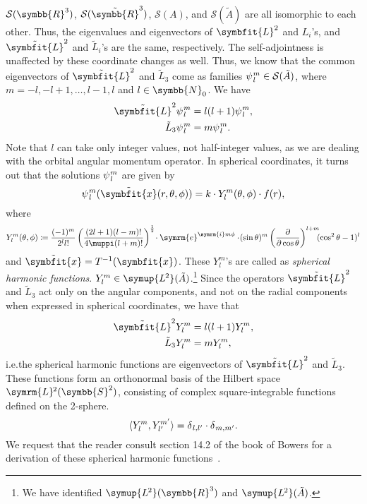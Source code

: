 \documentclass[12pt, a4 paper]{article}
\let\symcal\mathcal
\theoremstyle{definition}
\newcommand{\ltwo}{\symup{L\kern-0.5pt^2}}
\newcommand{\ltworthree}{\ltwo(\rr^3)}
\newcommand{\rr}{\symbb{R}}
\newcommand{\nn}{\symbb{N}_0}
\newcommand{\schwartz}{\symcal{S}}
\newcommand{\schwartzrthree}{\schwartz(\rr^3)}
\renewcommand{\i}{\symrm{i}}
\newcommand{\e}{\symrm{e}}
\renewcommand{\pi}{\muppi}
\newcommand{\lvecsquare}{\tilde{\symbfit{L}}^2}
\newcommand{\ltwoa}{\ltwo(\tilde{A})}
\newcommand{\sphe}{Y_l^m}
\begin{document}
    \(\schwartzrthree\), \(\schwartz(\tilde{\rr}^3)\), \(\schwartz(A)\), and \(\schwartz(\tilde{A})\) are all isomorphic to each other. Thus, the eigenvalues and eigenvectors of \(\symbfit{L}^2\) and \(L_i\)'s, and \(\lvecsquare\) and \(\tilde{L}_i\)'s are the same, respectively. The self-adjointness is unaffected by these coordinate changes as well. Thus, we know that the common eigenvectors of $\lvecsquare$ and $\tilde{L}_3$ come as families $\psi\kern0.5pt_l^m \in \schwartz(\tilde{A})$, where $m = -l, -l+1, \ldots, l-1, l$ and $l \in \nn$. We have
    \begin{align*}
        \lvecsquare \psi\kern0.5pt_l^m &= l(l+1)\psi\kern0.5pt_l^m,\\
        \tilde{L}_3 \psi\kern0.5pt_l^m &= m \psi\kern0.5pt_l^m.
    \end{align*}
    Note that $l$ can take only integer values, not half-integer values, as we are dealing with the orbital angular momentum operator. In spherical coordinates, it turns out that the solutions $\psi\kern0.5pt_l^m$ are given by
    \[
        \psi\kern0.5pt_l^m (\tilde{\symbfit{x}} (r, \theta, \phi)) = k \cdot Y^m_l (\theta, \phi) \cdot f(r),
    \]
    where
    \[
        Y^m_l (\theta, \phi) \coloneq \frac{(-1)^m}{2^l l!}\left(\frac{(2l+1) (l-m)!}{4\pi (l+m)!}\right)^{\frac{1}{2}}\!\cdot\e^{\i m\phi}\cdot\!(\sin{\theta})^m \left(\frac{\partial}{\partial \cos{\theta}}\right)^{l+m}\!\!\!(\cos^2{\theta} -1)^l
    \]
    and $\tilde{\symbfit{x}} = T^{-1}(\symbfit{x})$. These $\sphe$'s are called as \textit{spherical harmonic functions}. \(\sphe \in \ltwoa\).\footnote{We have identified \(\ltworthree\) and \(\ltwoa\).} Since the operators $\lvecsquare$ and $\tilde{L}_3$ act only on the angular components, and not on the radial components when expressed in spherical coordinates, we have that
    \begin{align*}
        \lvecsquare \sphe &= l(l+1) \sphe,\\
        \tilde{L}_3 \sphe &= m \sphe,
    \end{align*}
    i.e.\@ the spherical harmonic functions are eigenvectors of $\lvecsquare$ and $\tilde{L}_3$. These functions form an orthonormal basis of the Hilbert space $\symrm{L}\kern-0.7pt^2(\symbb{S}^2)$, consisting of complex square-integrable functions defined on the 2-sphere.
    \[
        \langle \sphe , Y_{l'}^{m'} \rangle = \delta\kern0.5pt_{l, l'}\cdot\delta\kern0.4pt_{m, m'}.
    \]
    We request that the reader consult section 14.2 of the book of Bowers for a derivation of these spherical harmonic functions~\cite[p.~200]{Bowers}.
\end{document}

